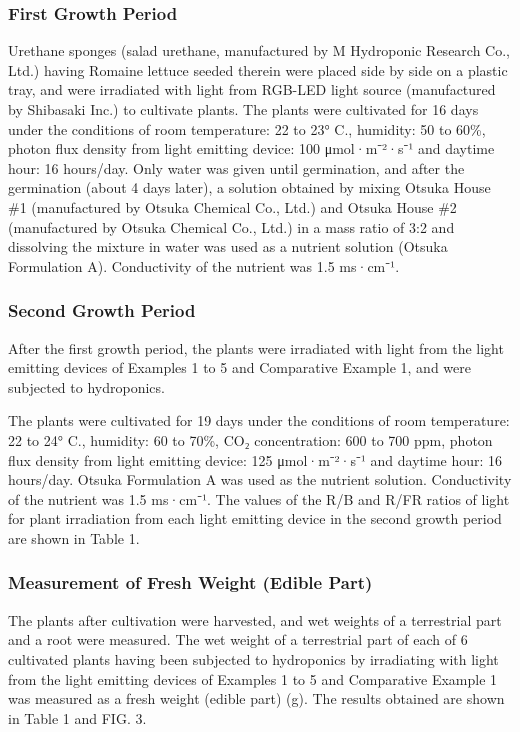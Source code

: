 \documentclass[11pt,a4paper]{article}
\begin{document}
\subsubsection{First Growth Period}

Urethane sponges (salad urethane, manufactured by M Hydroponic Research Co., Ltd.) having Romaine lettuce seeded therein were placed side by side on a plastic tray, and were irradiated with light from RGB-LED light source (manufactured by Shibasaki Inc.) to cultivate plants. The plants were cultivated for 16 days under the conditions of room temperature: 22 to 23° C., humidity: 50 to 60\%, photon flux density from light emitting device: 100 μmol·m⁻²·s⁻¹ and daytime hour: 16 hours/day. Only water was given until germination, and after the germination (about 4 days later), a solution obtained by mixing Otsuka House \#1 (manufactured by Otsuka Chemical Co., Ltd.) and Otsuka House \#2 (manufactured by Otsuka Chemical Co., Ltd.) in a mass ratio of 3:2 and dissolving the mixture in water was used as a nutrient solution (Otsuka Formulation A). Conductivity of the nutrient was 1.5 ms·cm⁻¹.

\subsubsection{Second Growth Period}

After the first growth period, the plants were irradiated with light from the light emitting devices of Examples 1 to 5 and Comparative Example 1, and were subjected to hydroponics.

The plants were cultivated for 19 days under the conditions of room temperature: 22 to 24° C., humidity: 60 to 70\%, CO₂ concentration: 600 to 700 ppm, photon flux density from light emitting device: 125 μmol·m⁻²·s⁻¹ and daytime hour: 16 hours/day. Otsuka Formulation A was used as the nutrient solution. Conductivity of the nutrient was 1.5 ms·cm⁻¹. The values of the R/B and R/FR ratios of light for plant irradiation from each light emitting device in the second growth period are shown in Table 1.

\subsubsection{Measurement of Fresh Weight (Edible Part)}

The plants after cultivation were harvested, and wet weights of a terrestrial part and a root were measured. The wet weight of a terrestrial part of each of 6 cultivated plants having been subjected to hydroponics by irradiating with light from the light emitting devices of Examples 1 to 5 and Comparative Example 1 was measured as a fresh weight (edible part) (g). The results obtained are shown in Table 1 and FIG. 3.
\end{document}
